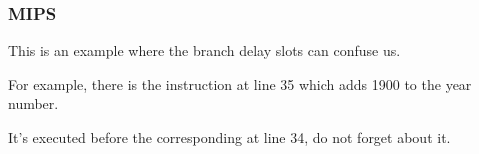 \subsubsection{MIPS}



This is an example where the branch delay slots can confuse us.

For example, there is the instruction  at line 35 which adds 1900 to the year number.

It's executed before the corresponding  at line 34, do not forget about it.

